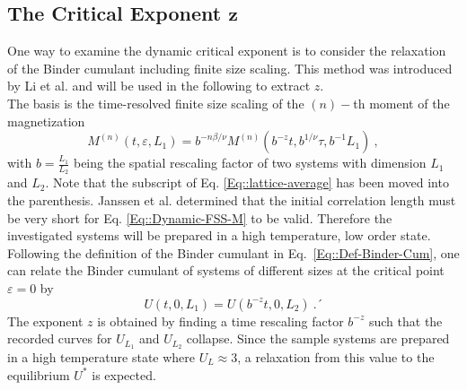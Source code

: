 	\subsection{The Critical Exponent $\boldsymbol{z}$}
	One way to examine the dynamic critical exponent is to consider the relaxation of the Binder cumulant including finite size scaling. This method was introduced by Li et al. \cite{li1995dynamic} and will be used in the following to extract $z$. \\
	
	The basis is the time-resolved finite size scaling of the $(n)-$th moment of the magnetization \cite{li1995dynamic}
	\begin{equation} \label{Eq::Dynamic-FSS-M}
		M^{(n)}(t, \varepsilon, L_1) = b^{-n \beta / \nu} M^{(n)}(b^{-z}t, b^{1 /	\nu} \tau, b^{-1} L_1) ~,
	\end{equation}
	with $b =	\tfrac{L_1}{L_2}$ being the spatial rescaling factor of two systems with dimension $L_1$ and $L_2$. Note that the subscript of Eq. \eqref{Eq::lattice-average} has been moved into the parenthesis. Janssen et al. \cite{janssen1989new} determined that the initial correlation length must be very short for Eq. \eqref{Eq::Dynamic-FSS-M} to be valid. Therefore the investigated systems will be prepared in a high temperature, low order state.
	Following the definition of the Binder cumulant in Eq.~\eqref{Eq::Def-Binder-Cum}, one can relate the Binder cumulant of systems of different sizes at the critical point $\varepsilon =	0$ by
	\begin{equation}
		U(t, 0, L_1) =	U(b^{-z} t, 0, L_2)~.´
	\end{equation}
	The exponent $z$ is obtained by finding a time rescaling factor $b^{-z}$ such that the recorded curves for $U_{L_1}$ and $U_{L_2}$ collapse. Since the sample systems are prepared in a high temperature state where $U_L \approx	3$, a relaxation from this value to the equilibrium $U^*$ is expected.
